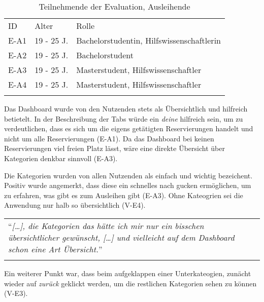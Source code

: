 \begin{table}[h]
  \centering
  \caption{Teilnehmende der Evaluation, Ausleihende}
  \begin{tabular}{lll}
    \arrayrulecolor{maincolor}\hline
    \sffamily\color{maincolor}ID & \sffamily\color{maincolor}Alter &
    \sffamily\color{maincolor}Rolle \\
    \arrayrulecolor{maincolor}\hline
    E-A1                         & 19 - 25 J.                      &
    Bachelorstudentin, Hilfswissenschaftlerin \\
    E-A2                         & 19 - 25 J.                      &
    Bachelorstudent                                                  \\
    E-A3                         & 19 - 25 J.                      &
    Masterstudent, Hilfswissenschaftler \\
    E-A4                         & 19 - 25 J.                      &
    Masterstudent, Hilfswissenschaftler \\
    \arrayrulecolor{maincolor}\hline
  \end{tabular}
  \label{table:azwei}
\end{table}

Das Dashboard wurde von den Nutzenden stets als Übersichtlich und hilfreich
betietelt. In der Beschreibung der Tabs würde ein \textit{deine} hilfreich sein,
um zu verdeutlichen, dass es sich um die eigens getätigten Reservierungen
handelt und nicht um alle Reservierungen (E-A1). Da das Dashboard bei keinen
Reservierungen viel freien Platz lässt, wäre eine direkte Übersicht über
Kategorien denkbar sinnvoll (E-A3). 

Die Kategorien wurden von allen Nutzenden als einfach und wichtig bezeichent.
Positiv wurde angemerkt, dass diese ein schnelles nach gucken ermöglichen, um zu
erfahren, was gibt es zum Ausleihen gibt (E-A3). Ohne Kateogrien sei die
Anwendung nur halb so übersichtlich (V-E4).

\begin{longtable}{p{}} \arrayrulecolor{maincolor}\hline
  \enquote{\textit{[\dots], die Kategorien das hätte ich mir nur ein bisschen
  übersichtlicher gewünscht, [\dots] und vielleicht auf dem Dashboard schon eine
  Art Übersicht.}} \\
  \arrayrulecolor{maincolor}\hline
\end{longtable}

Ein weiterer Punkt war, dass beim aufgeklappen einer Unterkateogien, zunächt
wieder auf \textit{zurück} geklickt werden, um die restlichen Kategorien sehen
zu können (V-E3). 


